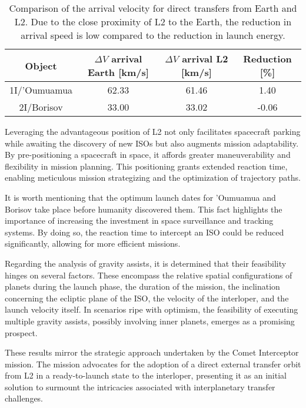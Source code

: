 \vspace{1cm}
\begin{table}[H]
  \centering
  \begin{tabular}{|c|c|c|c|}
    \hline
    Object       & $\Delta V$ arrival Earth [km/s] & $\Delta V$ arrival L2 [km/s] & Reduction [\%] \\
    \hline
    1I/'Oumuamua & 62.33                            & 61.46 & 1.40          \\
    \hline
    2I/Borisov   & 33.00                            & 33.02 & -0.06          \\
    \hline
  \end{tabular}
  \caption[Comparison of the arrival velocity for direct transfers from Earth and
    L2.]{Comparison of the arrival velocity for direct transfers from Earth and
        L2. Due to the close proximity of L2 to the Earth, the reduction in
        arrival speed is low compared to the reduction in launch energy.}
  \label{tab:summary-results-delta-v}
\end{table}

Leveraging the advantageous position of L2 not only facilitates spacecraft
parking while awaiting the discovery of new ISOs but also augments mission
adaptability. By pre-positioning a spacecraft in space, it affords greater
maneuverability and flexibility in mission planning. This positioning grants
extended reaction time, enabling meticulous mission strategizing and the
optimization of trajectory paths.

It is worth mentioning that the optimum launch dates for 'Oumuamua and Borisov
take place before humanity discovered them. This fact highlights the importance
of increasing the investment in space surveillance and tracking systems. By
doing so, the reaction time to intercept an ISO could be reduced significantly,
allowing for more efficient missions.

Regarding the analysis of gravity assists, it is determined that their
feasibility hinges on several factors. These encompass the relative spatial
configurations of planets during the launch phase, the duration of the mission,
the inclination concerning the ecliptic plane of the ISO, the velocity of the
interloper, and the launch velocity itself. In scenarios ripe with optimism, the
feasibility of executing multiple gravity assists, possibly involving inner
planets, emerges as a promising prospect.

These results mirror the strategic approach undertaken by the Comet Interceptor
mission. The mission advocates for the adoption of a direct external transfer
orbit from L2 in a ready-to-launch state to the interloper, presenting it as an
initial solution to surmount the intricacies associated with interplanetary
transfer challenges.

